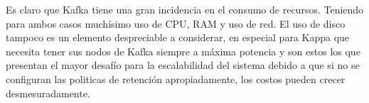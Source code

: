 Es claro que Kafka tiene una gran incidencia en el consumo de recursos. Teniendo para ambos casos muchísimo uso de CPU, RAM y uso de red. 
El uso de disco tampoco es un elemento despreciable a considerar, en especial para Kappa que necesita tener sus nodos de Kafka siempre a máxima potencia 
y son estos los que presentan el mayor desafío para la escalabilidad del sistema debido a que si no se configuran las politicas de retención apropiadamente, 
los costos pueden crecer desmesuradamente.



\newpage